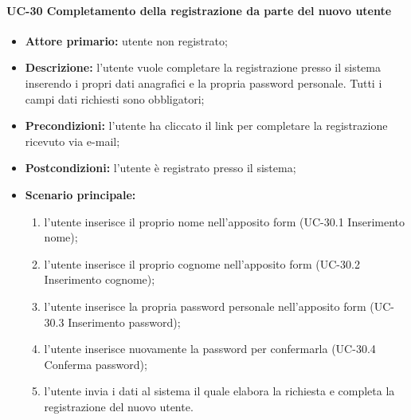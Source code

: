 
\paragraph{UC-30 Completamento della registrazione da parte del nuovo utente}

	\begin{itemize}
		\item \textbf{Attore primario:} utente non registrato;

		\item \textbf{Descrizione:} l'utente vuole completare la registrazione presso il sistema inserendo i propri dati anagrafici e la propria password personale. Tutti i campi dati richiesti sono obbligatori;

		\item \textbf{Precondizioni:} l'utente ha cliccato il link per completare la registrazione ricevuto via e-mail;

		\item \textbf{Postcondizioni:} l'utente è registrato presso il sistema;

		\item \textbf{Scenario principale:}
	      \begin{enumerate}
		      \item l'utente inserisce il proprio nome nell'apposito form (UC-30.1 Inserimento nome);
		      \item l'utente inserisce il proprio cognome nell'apposito form (UC-30.2 Inserimento cognome);
		      \item l'utente inserisce la propria password personale nell'apposito form (UC-30.3 Inserimento password);
		      \item l'utente inserisce nuovamente la password per confermarla (UC-30.4 Conferma password);
		      \item l'utente invia i dati al sistema il quale elabora la richiesta e completa la registrazione del nuovo utente.
	      \end{enumerate}
	\end{itemize}

